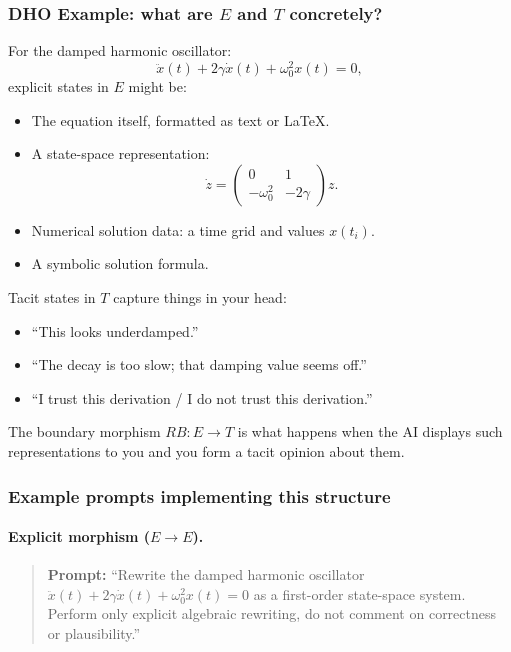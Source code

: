 \subsubsection*{DHO Example: what are $E$ and $T$ concretely?}

For the damped harmonic oscillator:
\[
\ddot{x}(t) + 2\gamma \dot{x}(t) + \omega_0^2 x(t) = 0,
\]
explicit states in $E$ might be:

\begin{itemize}
 \item The equation itself, formatted as text or LaTeX.
 \item A state-space representation:
 \[
 \dot{z} =
 \begin{pmatrix}
 0 & 1 \\
 -\omega_0^2 & -2\gamma
 \end{pmatrix} z.
 \]
 \item Numerical solution data: a time grid and values $x(t_i)$.
 \item A symbolic solution formula.
\end{itemize}

Tacit states in $T$ capture things in your head:

\begin{itemize}
 \item ``This looks underdamped.''
 \item ``The decay is too slow; that damping value seems off.''
 \item ``I trust this derivation / I do not trust this derivation.''
\end{itemize}

The boundary morphism $RB : E \to T$ is what happens when the AI displays such representations to
you and you form a tacit opinion about them.

\subsubsection*{Example prompts implementing this structure}

\paragraph{Explicit morphism ($E \to E$).}
\begin{quote}
\textbf{Prompt:} 
``Rewrite the damped harmonic oscillator
$\ddot{x}(t) + 2\gamma \dot{x}(t) + \omega_0^2 x(t) = 0$
as a first-order state-space system. Perform only explicit algebraic rewriting, do not comment on correctness or plausibility.''
\end{quote}

